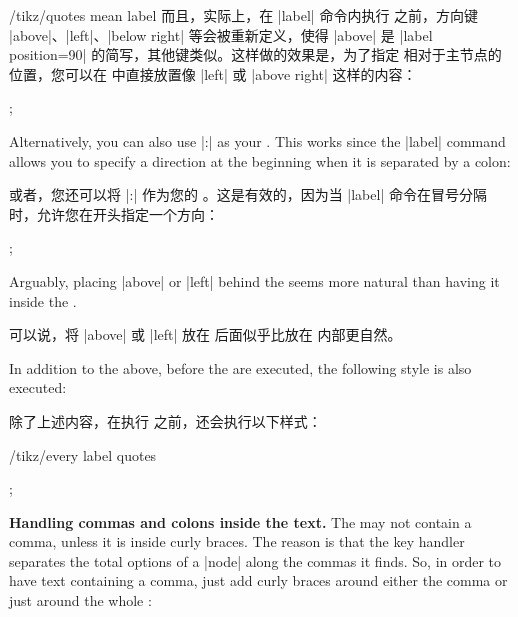 \begin{key}{/tikz/quotes mean label}
    而且，实际上，在 |label| 命令内执行  之前，方向键 |above|、|left|、|below right| 等会被重新定义，使得 |above| 是 |label position=90| 的简写，其他键类似。这样做的效果是，为了指定  相对于主节点的位置，您可以在  中直接放置像 |left| 或 |above right| 这样的内容：

\begin{codeexample}[preamble={\usetikzlibrary{quotes}}]
\tikz
  ;
\end{codeexample}

    Alternatively, you can also use |:| as
    your . This works since the |label| command allows you to
    specify a direction at the beginning when it is separated by a colon:
    
    或者，您还可以将 |:| 作为您的 。这是有效的，因为当 |label| 命令在冒号分隔时，允许您在开头指定一个方向：

\begin{codeexample}[preamble={\usetikzlibrary{quotes}}]
\tikz
  ;
\end{codeexample}
    Arguably, placing |above| or |left| behind the  seems more
    natural than having it inside the .

    可以说，将 |above| 或 |left| 放在  后面似乎比放在  内部更自然。

In addition to the above, before the  are executed, the
    following style is also executed:
    
    
    除了上述内容，在执行  之前，还会执行以下样式：
    \begin{stylekey}{/tikz/every label quotes}
\begin{codeexample}[preamble={\usetikzlibrary{quotes}}]
\tikz [every label quotes/.style=red]
  ;
\end{codeexample}
    \end{stylekey}

    \medskip
    \noindent\textbf{Handling commas and colons inside the text.}
    The  may not contain a comma, unless it is inside curly braces.
    The reason is that the key handler separates the total options of a |node|
    along the commas it finds. So, in order to have text containing a comma,
    just add curly braces around either the comma or just around the whole
    :


\end{key}
